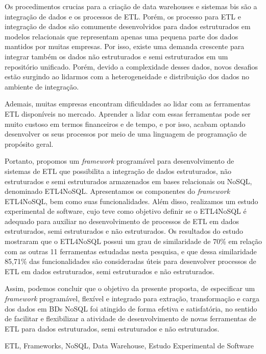 
Os procedimentos crucias para a criação de data warehouses e sistemas \acp{bi} são a integração de dados e os processos de ETL. Porém, os processo para ETL e integração de dados são comumente desenvolvidos para dados estruturados em modelos relacionais que representam apenas uma pequena parte dos dados mantidos por muitas empresas. Por isso, existe uma demanda crescente para integrar também os dados não estruturados e semi estruturados em um repositório unificado. Porém, devido a complexidade desses dados, novos desafios estão surgindo ao lidarmos com a heterogeneidade e distribuição dos dados no ambiente de integração.

Ademais, muitas empresas encontram dificuldades ao lidar com as ferramentas ETL disponíveis no mercado. Aprender a lidar com essas ferramentas pode ser muito custoso em termos financeiros e de tempo, e por isso, acabam optando desenvolver os seus processos por meio de uma linguagem de programação de propósito geral.

Portanto, propomos um \textit{framework} programável para desenvolvimento de sistemas de ETL que possibilita a integração de dados estruturados, não estruturados e semi estruturados armazenados em bases relacionais ou NoSQL, denominado ETL4NoSQL. Apresentamos os componentes do \textit{framework} ETL4NoSQL, bem como suas funcionalidades. Além disso, realizamos um estudo experimental de software, cujo teve como objetivo definir se o ETL4NoSQL é adequado para auxiliar no desenvolvimento de processos de ETL em dados estruturados, semi estruturados e não estruturados. Os resultados do estudo mostraram que o ETL4NoSQL possui um grau de similaridade de 70\% em relação com as outras 11 ferramentas estudadas nesta pesquisa, e que dessa similaridade 85,71\% das funcionalidades são consideradas úteis para desenvolver processos de ETL em dados estruturados, semi estruturados e não estruturados. 

Assim, podemos concluir que o objetivo da presente proposta, de especificar um \textit{framework} programável, flexível e integrado para extração, transformação e carga dos dados em BDs NoSQL foi atingido de forma efetiva e satisfatória, no sentido de facilitar e flexibilizar a atividade de desenvolvimento de novas ferramentas de ETL para dados estruturados, semi estruturados e não estruturados.

\begin{keywords}
ETL, Frameworks, NoSQL, Data Warehouse, Estudo Experimental de Software
\end{keywords}